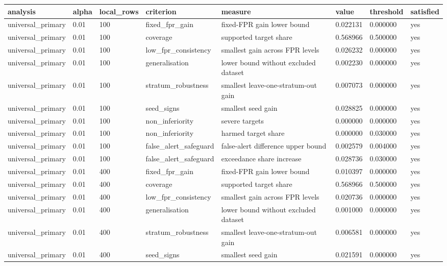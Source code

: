 \begin{tabular}{llllllll}
\toprule
analysis & alpha & local\_rows & criterion & measure & value & threshold & satisfied \\
\midrule
universal\_primary & 0.01 & 100 & fixed\_fpr\_gain & fixed-FPR gain lower bound & 0.022131 & 0.000000 & yes \\
universal\_primary & 0.01 & 100 & coverage & supported target share & 0.568966 & 0.500000 & yes \\
universal\_primary & 0.01 & 100 & low\_fpr\_consistency & smallest gain across FPR levels & 0.026232 & 0.000000 & yes \\
universal\_primary & 0.01 & 100 & generalisation & lower bound without excluded dataset & 0.002230 & 0.000000 & yes \\
universal\_primary & 0.01 & 100 & stratum\_robustness & smallest leave-one-stratum-out gain & 0.007073 & 0.000000 & yes \\
universal\_primary & 0.01 & 100 & seed\_signs & smallest seed gain & 0.028825 & 0.000000 & yes \\
universal\_primary & 0.01 & 100 & non\_inferiority & severe targets & 0.000000 & 0.000000 & yes \\
universal\_primary & 0.01 & 100 & non\_inferiority & harmed target share & 0.000000 & 0.030000 & yes \\
universal\_primary & 0.01 & 100 & false\_alert\_safeguard & false-alert difference upper bound & 0.002579 & 0.004000 & yes \\
universal\_primary & 0.01 & 100 & false\_alert\_safeguard & exceedance share increase & 0.028736 & 0.030000 & yes \\
universal\_primary & 0.01 & 400 & fixed\_fpr\_gain & fixed-FPR gain lower bound & 0.010397 & 0.000000 & yes \\
universal\_primary & 0.01 & 400 & coverage & supported target share & 0.568966 & 0.500000 & yes \\
universal\_primary & 0.01 & 400 & low\_fpr\_consistency & smallest gain across FPR levels & 0.020736 & 0.000000 & yes \\
universal\_primary & 0.01 & 400 & generalisation & lower bound without excluded dataset & 0.001000 & 0.000000 & yes \\
universal\_primary & 0.01 & 400 & stratum\_robustness & smallest leave-one-stratum-out gain & 0.006581 & 0.000000 & yes \\
universal\_primary & 0.01 & 400 & seed\_signs & smallest seed gain & 0.021591 & 0.000000 & yes \\

\end{tabular}
